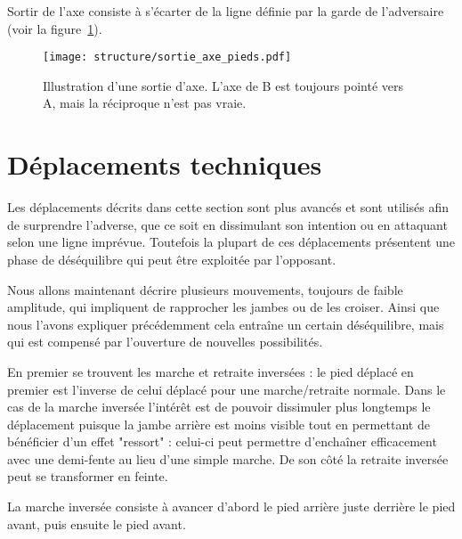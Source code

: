 \begin{definition}
\label{dep:def:sortie-axe}

Sortir de l'axe consiste à s'écarter de la ligne définie par la garde de l'adversaire (voir la figure~\ref{def:fig:sortie-garde}).
\end{definition}


\begin{figure}[ht]
	\centering
	\texttt{[image: structure/sortie\_axe\_pieds.pdf]}
	\caption{Illustration d'une sortie d'axe.
	L'axe de B est toujours pointé vers A, mais la réciproque n'est pas vraie.}
	\label{def:fig:sortie-garde}
\end{figure}


\section{Déplacements techniques}


Les déplacements décrits dans cette section sont plus avancés et sont utilisés afin de surprendre l'adverse, que ce soit en dissimulant son intention ou en attaquant selon une ligne imprévue.
Toutefois la plupart de ces déplacements présentent une phase de déséquilibre qui peut être exploitée par l'opposant.

Nous allons maintenant décrire plusieurs mouvements, toujours de faible amplitude, qui impliquent de rapprocher les jambes ou de les croiser.
Ainsi que nous l'avons expliquer précédemment cela entraîne un certain déséquilibre, mais qui est compensé par l'ouverture de nouvelles possibilités.

En premier se trouvent les marche et retraite inversées : le pied déplacé en premier est l'inverse de celui déplacé pour une marche/retraite normale.
Dans le cas de la marche inversée l'intérêt est de pouvoir dissimuler plus longtemps le déplacement puisque la jambe arrière est moins visible tout en permettant de bénéficier d'un effet "ressort" : celui-ci peut permettre d'enchaîner efficacement avec une demi-fente au lieu d'une simple marche.
De son côté la retraite inversée peut se transformer en feinte.


\begin{definition}

La marche inversée consiste à avancer d'abord le pied arrière juste derrière le pied avant, puis ensuite le pied avant.
\end{definition}


